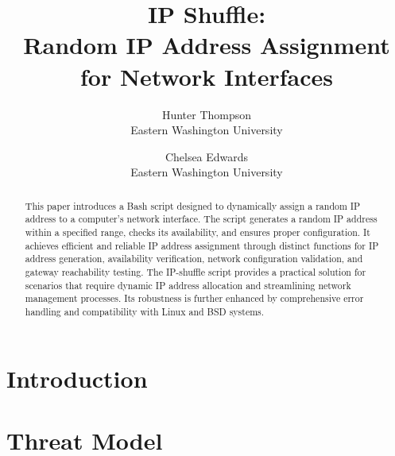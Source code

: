 \documentclass[letterpaper,twocolumn,10pt]{article}
\begin{document}

\date{}

\title{\Large \bf IP Shuffle:\\
Random IP Address Assignment for Network Interfaces}

\author{
{\rm Hunter Thompson}\\
Eastern Washington University
\and
{\rm Chelsea Edwards}\\
Eastern Washington University
} %

\maketitle


\begin{abstract}
This paper introduces a Bash script designed to dynamically assign a random IP address to a computer's network interface. The script generates a random IP address within a specified range, checks its availability, and ensures proper configuration. It achieves efficient and reliable IP address assignment through distinct functions for IP address generation, availability verification, network configuration validation, and gateway reachability testing. The IP-shuffle script provides a practical solution for scenarios that require dynamic IP address allocation and streamlining network management processes. Its robustness is further enhanced by comprehensive error handling and compatibility with Linux and BSD systems.
\end{abstract}


\section{Introduction}



\section{Threat Model}


\end{document}
